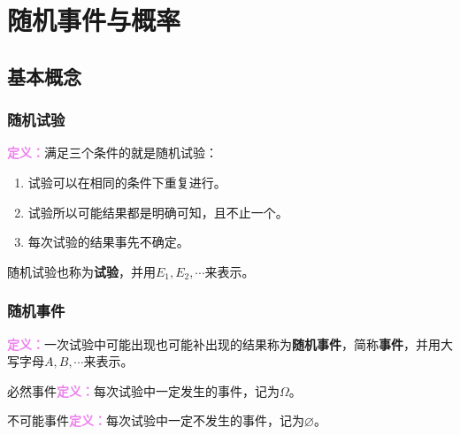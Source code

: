 \setcounter{tocdepth}{4}
\setcounter{secnumdepth}{4}
\renewcommand{\baselinestretch}{1.5}
\chapter{随机事件与概率}
\section{基本概念}

\subsection{随机试验}

\textcolor{violet}{\textbf{定义：}}满足三个条件的就是随机试验：

\begin{enumerate}
    \item 试验可以在相同的条件下重复进行。
    \item 试验所以可能结果都是明确可知，且不止一个。
    \item 每次试验的结果事先不确定。
\end{enumerate}

随机试验也称为\textbf{试验}，并用$E_1,E_2,\cdots$来表示。

\subsection{随机事件}

\textcolor{violet}{\textbf{定义：}}一次试验中可能出现也可能补出现的结果称为\textbf{随机事件}，简称\textbf{事件}，并用大写字母$A,B,\cdots$来表示。

必然事件\textcolor{violet}{\textbf{定义：}}每次试验中一定发生的事件，记为$\Omega$。

不可能事件\textcolor{violet}{\textbf{定义：}}每次试验中一定不发生的事件，记为$\varnothing$。

